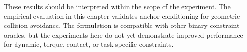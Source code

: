 These results should be interpreted within the scope of the experiment. The empirical evaluation in this chapter validates anchor conditioning for geometric collision avoidance. The formulation is compatible with other binary constraint oracles, but the experiments here do not yet demonstrate improved performance for dynamic, torque, contact, or task-specific constraints.






